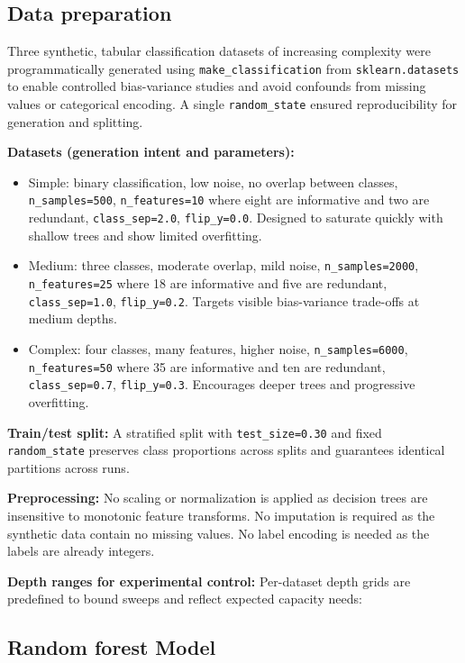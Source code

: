 \documentclass[conference]{IEEEtran}
\begin{document}
\subsection{Data preparation}
Three synthetic, tabular classification datasets of increasing complexity were programmatically generated using 
\texttt{make\_classification} from \texttt{sklearn.datasets} \cite{scikit-learn} to enable controlled bias-variance studies and
 avoid confounds from missing values or categorical encoding. A single \texttt{random\_state} ensured reproducibility for generation and splitting.

\textbf{Datasets (generation intent and parameters):}
\begin{itemize}
  \item Simple: binary classification, low noise, no overlap between classes, \texttt{n\_samples=500}, \texttt{n\_features=10} where eight are informative and two are redundant, \texttt{class\_sep=2.0}, \texttt{flip\_y=0.0}. Designed to saturate quickly with shallow trees and show limited overfitting.
  \item Medium: three classes, moderate overlap, mild noise, \texttt{n\_samples=2000}, \texttt{n\_features=25} where 18 are informative and five are redundant, \texttt{class\_sep=1.0}, \texttt{flip\_y=0.2}. Targets visible bias-variance trade-offs at medium depths.
  \item Complex: four classes, many features, higher noise, \texttt{n\_samples=6000}, \texttt{n\_features=50} where 35 are informative and ten are redundant, \texttt{class\_sep=0.7}, \texttt{flip\_y=0.3}. Encourages deeper trees and progressive overfitting.
\end{itemize}

\textbf{Train/test split:} A stratified split with \texttt{test\_size=0.30} and fixed \texttt{random\_state} preserves 
class proportions across splits and guarantees identical partitions across runs.


\textbf{Preprocessing:} No scaling or normalization is applied as decision trees are insensitive to monotonic feature transforms. No imputation is
 required as the synthetic data contain no missing values. No label encoding is needed as the labels are already integers.

\textbf{Depth ranges for experimental control:} Per-dataset depth grids are predefined to bound sweeps and reflect expected capacity needs:


\subsection{Random forest Model}
\end{document}
